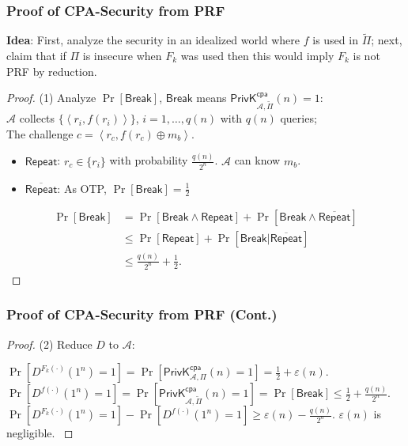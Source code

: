 \begin{frame}\frametitle{Proof of CPA-Security from PRF}
\textbf{Idea}: First, analyze the security in an idealized world where $f$ is used in $\tilde{\Pi}$; next, claim that if $\Pi$ is insecure when $F_k$ was used then this would imply $F_k$ is not PRF by reduction.
\begin{proof}
(1) Analyze $\Pr[\mathsf{Break}]$, $\mathsf{Break}$ means $\mathsf{PrivK}_{\mathcal{A},\tilde{\Pi}}^{\mathsf{cpa}}(n) = 1$:  \\
$\mathcal{A}$ collects $\{ \left< r_i, f(r_i) \right> \}$, $i=1,\dots,q(n)$ with $q(n)$ queries; \\
The challenge $c=\left<r_c, f(r_c)\oplus m_b\right>$. \\
\begin{itemize}
\item $\mathsf{Repeat}$: $r_c \in \{ r_i \}$ with probability $\frac{q(n)}{2^n}$. $\mathcal{A}$ can know $m_b$.
\item $\overline{\mathsf{Repeat}}$: As OTP, $\Pr[\mathsf{Break}]=\frac{1}{2}$ 
\end{itemize}
\[
\begin{split}
	\Pr[\mathsf{Break}] & =\Pr[\mathsf{Break} \land \mathsf{Repeat}] + \Pr[\mathsf{Break} \land \overline{\mathsf{Repeat}}] \\
	&\le \Pr[\mathsf{Repeat}] + \Pr[\mathsf{Break} | \overline{\mathsf{Repeat}}] \\
	&\le \frac{q(n)}{2^n} + \frac{1}{2}.
\end{split}
\]
\end{proof}
\end{frame}
\begin{frame}\frametitle{Proof of CPA-Security from PRF (Cont.)}
\begin{proof}
(2) Reduce $D$ to $\mathcal{A}$:
\begin{figure}
\begin{center}

\end{center}
\end{figure}
{\footnotesize 
$ \Pr[D^{F_k(\cdot)}(1^n)=1] = \Pr[\mathsf{PrivK}_{\mathcal{A},\Pi}^{\mathsf{cpa}}(n) = 1] = \frac{1}{2} + \varepsilon(n). $
$ \Pr[D^{f(\cdot)}(1^n)=1] = \Pr[\mathsf{PrivK}_{\mathcal{A},\tilde{\Pi}}^{\mathsf{cpa}}(n) = 1] = \Pr[\mathsf{Break}] \le \frac{1}{2} + \frac{q(n)}{2^n}. $
$\Pr[D^{F_k(\cdot)}(1^n)=1] - \Pr[D^{f(\cdot)}(1^n)=1] \ge \varepsilon(n) - \frac{q(n)}{2^n}.$
$\varepsilon(n)$ is negligible.
}
\end{proof}
\end{frame}
